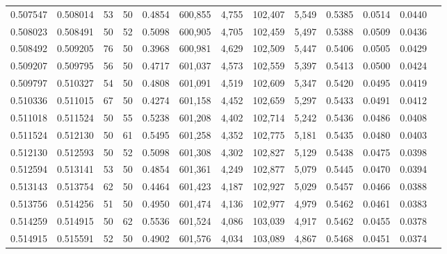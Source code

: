 \begin{tabular}{rrrrrrrrrrrrr}
0.507547 & 0.508014 &    53 &  50 &                                     0.4854 & 600,855 &   4,755 & 102,407 &   5,549 & 0.5385 & 0.0514 & 0.0440 \\
0.508023 & 0.508491 &    50 &  52 &                                     0.5098 & 600,905 &   4,705 & 102,459 &   5,497 & 0.5388 & 0.0509 & 0.0436 \\
0.508492 & 0.509205 &    76 &  50 &                                     0.3968 & 600,981 &   4,629 & 102,509 &   5,447 & 0.5406 & 0.0505 & 0.0429 \\
0.509207 & 0.509795 &    56 &  50 &                                     0.4717 & 601,037 &   4,573 & 102,559 &   5,397 & 0.5413 & 0.0500 & 0.0424 \\
0.509797 & 0.510327 &    54 &  50 &                                     0.4808 & 601,091 &   4,519 & 102,609 &   5,347 & 0.5420 & 0.0495 & 0.0419 \\
0.510336 & 0.511015 &    67 &  50 &                                     0.4274 & 601,158 &   4,452 & 102,659 &   5,297 & 0.5433 & 0.0491 & 0.0412 \\
0.511018 & 0.511524 &    50 &  55 &                                     0.5238 & 601,208 &   4,402 & 102,714 &   5,242 & 0.5436 & 0.0486 & 0.0408 \\
0.511524 & 0.512130 &    50 &  61 &                                     0.5495 & 601,258 &   4,352 & 102,775 &   5,181 & 0.5435 & 0.0480 & 0.0403 \\
0.512130 & 0.512593 &    50 &  52 &                                     0.5098 & 601,308 &   4,302 & 102,827 &   5,129 & 0.5438 & 0.0475 & 0.0398 \\
0.512594 & 0.513141 &    53 &  50 &                                     0.4854 & 601,361 &   4,249 & 102,877 &   5,079 & 0.5445 & 0.0470 & 0.0394 \\
0.513143 & 0.513754 &    62 &  50 &                                     0.4464 & 601,423 &   4,187 & 102,927 &   5,029 & 0.5457 & 0.0466 & 0.0388 \\
0.513756 & 0.514256 &    51 &  50 &                                     0.4950 & 601,474 &   4,136 & 102,977 &   4,979 & 0.5462 & 0.0461 & 0.0383 \\
0.514259 & 0.514915 &    50 &  62 &                                     0.5536 & 601,524 &   4,086 & 103,039 &   4,917 & 0.5462 & 0.0455 & 0.0378 \\
0.514915 & 0.515591 &    52 &  50 &                                     0.4902 & 601,576 &   4,034 & 103,089 &   4,867 & 0.5468 & 0.0451 & 0.0374 \\

\end{tabular}
